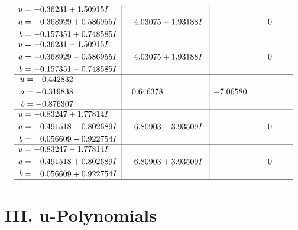 \documentclass[1p]{elsarticle_modified}
\theoremstyle{definition}
\begin{document}
$$\begin{array}{c|c|c}
\begin{aligned}
u &= -0.36231 + 1.50915 I \\
a &= -0.368929 + 0.586955 I \\
b &= -0.157351 + 0.748585 I\end{aligned}
 & \phantom{-}4.03075 - 1.93188 I & \phantom{-0.000000 } 0 \\ \hline\begin{aligned}
u &= -0.36231 - 1.50915 I \\
a &= -0.368929 - 0.586955 I \\
b &= -0.157351 - 0.748585 I\end{aligned}
 & \phantom{-}4.03075 + 1.93188 I & \phantom{-0.000000 } 0 \\ \hline\begin{aligned}
u &= -0.442832\phantom{ +0.000000I} \\
a &= -0.319838\phantom{ +0.000000I} \\
b &= -0.876307\phantom{ +0.000000I}\end{aligned}
 & \phantom{-}0.646378\phantom{ +0.000000I} & -7.06580\phantom{ +0.000000I} \\ \hline\begin{aligned}
u &= -0.83247 + 1.77814 I \\
a &= \phantom{-}0.491518 - 0.802689 I \\
b &= \phantom{-}0.056609 - 0.922754 I\end{aligned}
 & \phantom{-}6.80903 - 3.93509 I & \phantom{-0.000000 } 0 \\ \hline\begin{aligned}
u &= -0.83247 - 1.77814 I \\
a &= \phantom{-}0.491518 + 0.802689 I \\
b &= \phantom{-}0.056609 + 0.922754 I\end{aligned}
 & \phantom{-}6.80903 + 3.93509 I & \phantom{-0.000000 } 0\\
 \hline 
 \end{array}$$\newpage
\newpage\renewcommand{\arraystretch}{1}
\centering \section*{ III. u-Polynomials}
\end{document}
